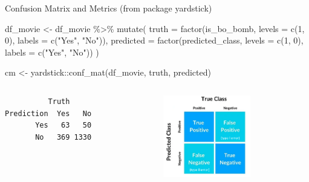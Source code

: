 \documentclass[
  10pt,
  ignorenonframetext,
]{beamer}
\newenvironment{Shaded}{\begin{snugshade}}{\end{snugshade}}
\newcommand{\AttributeTok}[1]{\textcolor[rgb]{0.40,0.45,0.13}{#1}}
\newcommand{\DecValTok}[1]{\textcolor[rgb]{0.68,0.00,0.00}{#1}}
\newcommand{\FunctionTok}[1]{\textcolor[rgb]{0.28,0.35,0.67}{#1}}
\newcommand{\NormalTok}[1]{\textcolor[rgb]{0.00,0.23,0.31}{#1}}
\newcommand{\OtherTok}[1]{\textcolor[rgb]{0.00,0.23,0.31}{#1}}
\newcommand{\SpecialCharTok}[1]{\textcolor[rgb]{0.37,0.37,0.37}{#1}}
\newcommand{\StringTok}[1]{\textcolor[rgb]{0.13,0.47,0.30}{#1}}
\begin{document}
\begin{frame}[fragile]{Confusion Matrix and Metrics (from package
yardstick)}
\label{confusion-matrix-and-metrics-from-package-yardstick}
\scriptsize

\begin{Shaded}
\begin{Highlighting}[]
\NormalTok{df\_movie }\OtherTok{\textless{}{-}}\NormalTok{ df\_movie }\SpecialCharTok{\%\textgreater{}\%}
  \FunctionTok{mutate}\NormalTok{(}
    \AttributeTok{truth =} \FunctionTok{factor}\NormalTok{(is\_bo\_bomb, }\AttributeTok{levels =} \FunctionTok{c}\NormalTok{(}\DecValTok{1}\NormalTok{, }\DecValTok{0}\NormalTok{), }\AttributeTok{labels =} \FunctionTok{c}\NormalTok{(}\StringTok{"Yes"}\NormalTok{, }\StringTok{"No"}\NormalTok{)),}
    \AttributeTok{predicted =} \FunctionTok{factor}\NormalTok{(predicted\_class, }\AttributeTok{levels =} \FunctionTok{c}\NormalTok{(}\DecValTok{1}\NormalTok{, }\DecValTok{0}\NormalTok{), }\AttributeTok{labels =} \FunctionTok{c}\NormalTok{(}\StringTok{"Yes"}\NormalTok{, }\StringTok{"No"}\NormalTok{))}
\NormalTok{  )}

\NormalTok{cm }\OtherTok{\textless{}{-}}\NormalTok{ yardstick}\SpecialCharTok{::}\FunctionTok{conf\_mat}\NormalTok{(df\_movie, truth, predicted)}
\end{Highlighting}
\end{Shaded}

\begin{columns}[T]
\begin{column}{0.48\textwidth}
\vspace{1.1cm}

\begin{verbatim}
          Truth
Prediction  Yes   No
       Yes   63   50
       No   369 1330
\end{verbatim}
\end{column}

\begin{column}{0.48\textwidth}
\includegraphics[width=1.5in,height=\textheight]{confusion_matrix.png}
\end{column}
\end{columns}
\end{frame}
\end{document}
